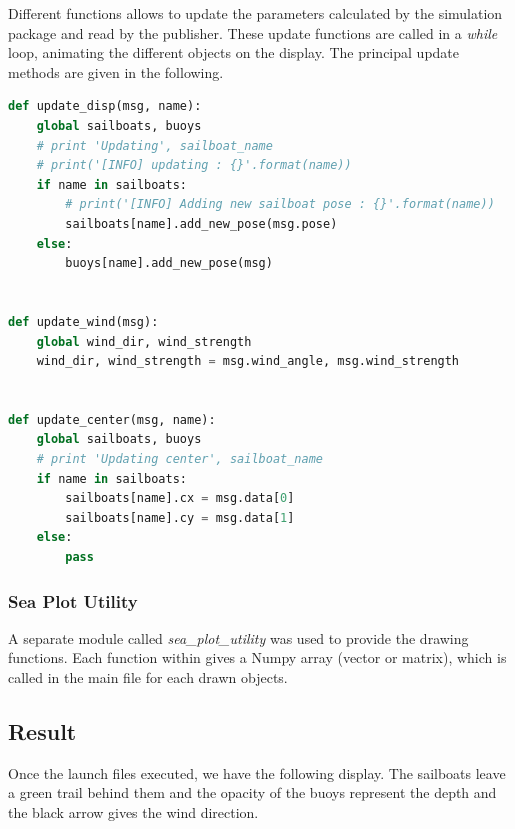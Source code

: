 \documentclass[a4paper]{report}
\begin{document}
Different functions allows to update the  parameters calculated by the simulation package and read by the publisher. These update functions are called in a \textit{while} loop, animating the different objects on the display. The principal update methods are given in the following.  

\renewcommand{\lstlistingname}{Code}
\begin{lstlisting}[caption=Update Functions, frame=single,language=Python]
def update_disp(msg, name):
    global sailboats, buoys
    # print 'Updating', sailboat_name
    # print('[INFO] updating : {}'.format(name))
    if name in sailboats:
        # print('[INFO] Adding new sailboat pose : {}'.format(name))
        sailboats[name].add_new_pose(msg.pose)
    else:
        buoys[name].add_new_pose(msg)


def update_wind(msg):
    global wind_dir, wind_strength
    wind_dir, wind_strength = msg.wind_angle, msg.wind_strength


def update_center(msg, name):
    global sailboats, buoys
    # print 'Updating center', sailboat_name
    if name in sailboats:
        sailboats[name].cx = msg.data[0]
        sailboats[name].cy = msg.data[1]
    else:
        pass
\end{lstlisting}



\subsubsection{Sea Plot Utility}
A separate module called \textit{sea\_plot\_utility} was used to provide the drawing functions. Each function within gives a Numpy array (vector or matrix), which is called in the main file for each drawn objects. 
\subsection{Result}

Once the launch files executed, we have the following display. The sailboats leave a green trail behind them and the opacity of the buoys represent the depth and the black arrow gives the wind direction. 
\end{document}
